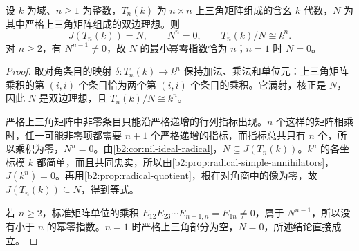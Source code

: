 \begin{proposition}\label{b2:prop:triangular-radical}
	设 \(k\) 为域、\(n\ge1\) 为整数，\(T_n(k)\) 为 \(n\times n\) 上三角矩阵组成的含幺 \(k\) 代数，\(N\) 为其中严格上三角矩阵组成的双边理想。则
	\[
		J(T_n(k))=N,\qquad N^n=0,\qquad T_n(k)/N\cong k^n.
	\]
	对 \(n\ge2\)，有 \(N^{n-1}\ne0\)，故 \(N\) 的最小幂零指数恰为 \(n\)；\(n=1\) 时 \(N=0\)。
\end{proposition}
\begin{proof}
	取对角条目的映射 \(\delta:T_n(k)\to k^n\) 保持加法、乘法和单位元：上三角矩阵乘积的第 \((i,i)\) 个条目恰为两个第 \((i,i)\) 个条目的乘积。它满射，核正是 \(N\)，因此 \(N\) 是双边理想，且 \(T_n(k)/N\cong k^n\)。

	严格上三角矩阵中非零条目只能沿严格递增的行列指标出现。\(n\) 个这样的矩阵相乘时，任一可能非零项都需要 \(n+1\) 个严格递增的指标，而指标总共只有 \(n\) 个，所以乘积为零，\(N^n=0\)。由\cref{b2:cor:nil-ideal-radical}，\(N\subseteq J(T_n(k))\)。\(k^n\) 的各坐标模 \(k\) 都简单，而且共同忠实，所以由\cref{b2:prop:radical-simple-annihilators}，\(J(k^n)=0\)。再用\cref{b2:prop:radical-quotient}，根在对角商中的像为零，故 \(J(T_n(k))\subseteq N\)，得到等式。

	若 \(n\ge2\)，标准矩阵单位的乘积 \(E_{12}E_{23}\cdots E_{n-1,n}=E_{1n}\ne0\)，属于 \(N^{n-1}\)，所以没有小于 \(n\) 的幂零指数。\(n=1\) 时严格上三角部分为空，\(N=0\)，所述结论直接成立。
\end{proof}
